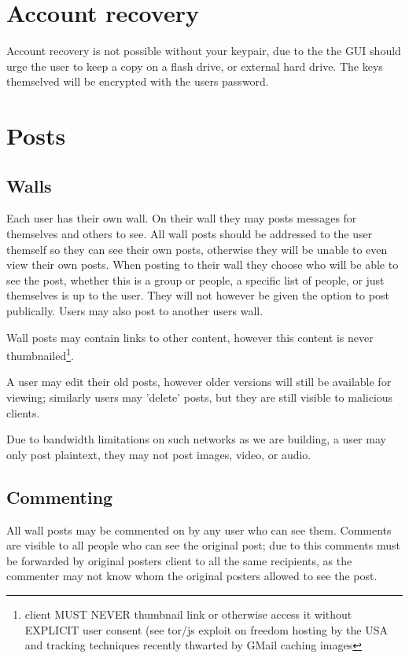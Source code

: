 \section{Account recovery}
Account recovery is not possible without your keypair, due to the the GUI should
urge the user to keep a copy on a flash drive, or external hard drive. The keys
themselved will be encrypted with the users password.

\section{Posts}
\subsection{Walls}
Each user has their own wall. On their wall they may posts messages for
themselves and others to see. All wall posts should be addressed to the user
themself so they can see their own posts, otherwise they will be unable to even
view their own posts. When posting to their wall they choose who will be able to
see the post, whether this is a group or people, a specific list of people, or
just themselves is up to the user. They will not however be given the option to
post publically. Users may also post to another users wall.

Wall posts may contain links to other content, however this content is never
thumbnailed\footnote{client MUST NEVER thumbnail link or otherwise access it
without EXPLICIT user consent (see tor/js exploit on freedom hosting by the USA
and tracking techniques recently thwarted by GMail caching images}.

A user may edit their old posts, however older versions will still be available
for viewing; similarly users may 'delete' posts, but they are still visible to
malicious clients.

Due to bandwidth limitations on such networks as we are building, a user may
only post plaintext, they may not post images, video, or audio.

\subsection{Commenting}
All wall posts may be commented on by any user who can see them. Comments are
visible to all people who can see the original post; due to this comments must
be forwarded by original posters client to all the same recipients, as the
commenter may not know whom the original posters allowed to see the post.
    
